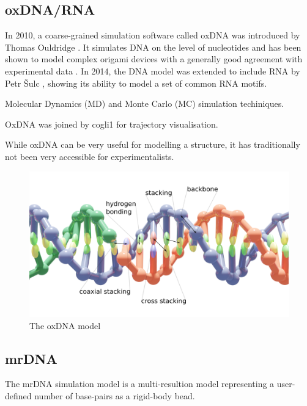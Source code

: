 \subsection{oxDNA/RNA}
\label{sec:oxDNA}
In 2010, a coarse-grained simulation software called oxDNA was introduced by Thomas Ouldridge \cite{ouldridge2010dna}. It simulates DNA on the level of nucleotides and has been shown to model complex origami devices with a generally good agreement with experimental data \cite{sharma2017characterizing}. In 2014, the DNA model was extended to include RNA by Petr {\v{S}}ulc \cite{vsulc2014nucleotide}, showing its ability to model a set of common RNA motifs. 

Molecular Dynamics (MD) and Monte Carlo (MC) simulation techiniques.

OxDNA was joined by cogli1 for trajectory visualisation.



While oxDNA can be very useful for modelling a structure, it has traditionally not been very accessible for experimentalists. %

\begin{figure}[h]
\begin{center}
    \includegraphics[width=\textwidth]{figures/oxdna_annot.png}
    \caption{The oxDNA model}
    \label{fig_oxDNA}
    \end{center}
\end{figure}

\subsection{mrDNA}
The mrDNA simulation model is a multi-resultion model representing a user-defined number of base-pairs as a rigid-body bead.

